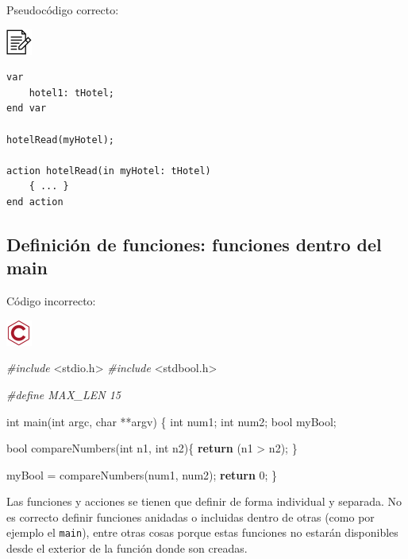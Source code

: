 \documentclass[
]{book}
\newenvironment{Shaded}{\begin{snugshade}}{\end{snugshade}}
\newcommand{\ControlFlowTok}[1]{\textcolor[rgb]{0.13,0.29,0.53}{\textbf{#1}}}
\newcommand{\DataTypeTok}[1]{\textcolor[rgb]{0.13,0.29,0.53}{#1}}
\newcommand{\DecValTok}[1]{\textcolor[rgb]{0.00,0.00,0.81}{#1}}
\newcommand{\ImportTok}[1]{#1}
\newcommand{\NormalTok}[1]{#1}
\newcommand{\PreprocessorTok}[1]{\textcolor[rgb]{0.56,0.35,0.01}{\textit{#1}}}
\begin{document}
Pseudocódigo correcto:

\includegraphics{./img/alg.png}

\begin{verbatim}
var
    hotel1: tHotel;
end var

hotelRead(myHotel);

action hotelRead(in myHotel: tHotel)
    { ... }
end action
\end{verbatim}

\hypertarget{definiciuxf3n-de-funciones-funciones-dentro-del-main}{%
\subsection{Definición de funciones: funciones dentro del main}\label{definiciuxf3n-de-funciones-funciones-dentro-del-main}}

Código incorrecto:

\includegraphics{./img/c_err.png}

\begin{Shaded}
\begin{Highlighting}[]
\PreprocessorTok{\#include }\ImportTok{\textless{}stdio.h\textgreater{}}
\PreprocessorTok{\#include }\ImportTok{\textless{}stdbool.h\textgreater{}}

\PreprocessorTok{\#define MAX\_LEN 15}

\DataTypeTok{int}\NormalTok{ main(}\DataTypeTok{int}\NormalTok{ argc, }\DataTypeTok{char}\NormalTok{ **argv) \{}
    \DataTypeTok{int}\NormalTok{ num1;}
    \DataTypeTok{int}\NormalTok{ num2;}
    \DataTypeTok{bool}\NormalTok{ myBool;}

    \DataTypeTok{bool}\NormalTok{ compareNumbers(}\DataTypeTok{int}\NormalTok{ n1, }\DataTypeTok{int}\NormalTok{ n2)\{}
       \ControlFlowTok{return}\NormalTok{ (n1 \textgreater{} n2); }
\NormalTok{    \}}
    
\NormalTok{    myBool = compareNumbers(num1, num2);}
    \ControlFlowTok{return} \DecValTok{0}\NormalTok{;}
\NormalTok{\}}
\end{Highlighting}
\end{Shaded}

Las funciones y acciones se tienen que definir de forma individual y separada. No es correcto definir funciones anidadas o incluidas dentro de otras (como por ejemplo el \texttt{main}), entre otras cosas porque estas funciones no estarán disponibles desde el exterior de la función donde son creadas.
\end{document}
